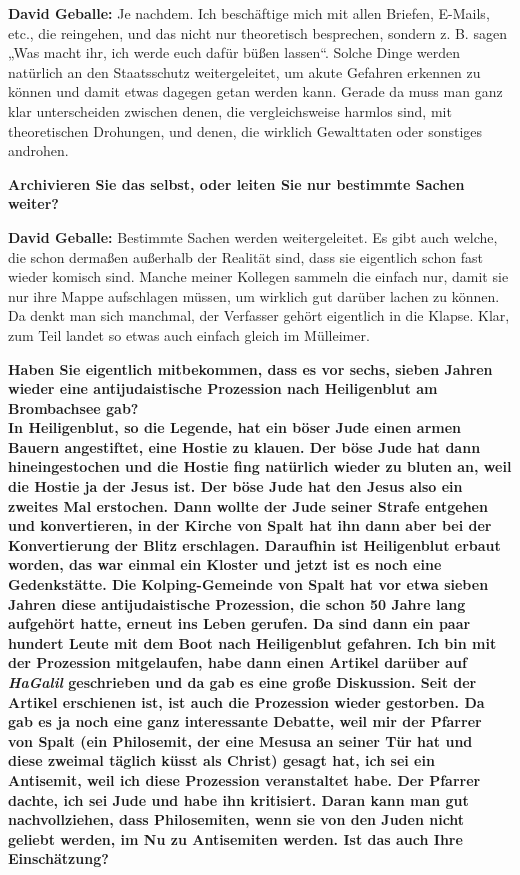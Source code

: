 \textbf{David Geballe:} Je nachdem. Ich beschäftige mich mit allen Briefen, E-Mails, etc., die reingehen, und das nicht nur theoretisch besprechen, sondern z. B. sagen „Was macht ihr, ich werde euch dafür büßen lassen“. Solche Dinge werden natürlich an den Staatsschutz weitergeleitet, um akute Gefahren erkennen zu können und damit etwas dagegen getan werden kann. Gerade da muss man ganz klar unterscheiden zwischen denen, die vergleichsweise harmlos sind, mit theoretischen Drohungen, und denen, die wirklich Gewalttaten oder sonstiges androhen. 

\textbf{Archivieren Sie das selbst, oder leiten Sie nur bestimmte Sachen weiter?} 

\textbf{David Geballe:} Bestimmte Sachen werden weitergeleitet. Es gibt auch welche, die schon dermaßen außerhalb der Realität sind, dass sie eigentlich schon fast wieder komisch sind. Manche meiner Kollegen sammeln die einfach nur, damit sie nur ihre Mappe aufschlagen müssen, um wirklich gut darüber lachen zu können. Da denkt man sich manchmal, der Verfasser gehört eigentlich in die Klapse. Klar, zum Teil landet so etwas auch einfach gleich im Mülleimer. 

\textbf{Haben Sie eigentlich mitbekommen, dass es vor sechs, sieben Jahren wieder eine antijudaistische Prozession nach Heiligenblut am Brombachsee gab? \\
In Heiligenblut, so die Legende, hat ein böser Jude einen armen Bauern angestiftet, eine Hostie zu klauen. Der böse Jude hat dann hineingestochen und die Hostie fing natürlich wieder zu bluten an, weil die Hostie ja der Jesus ist. Der böse Jude hat den Jesus also ein zweites Mal erstochen. Dann wollte der Jude seiner Strafe entgehen und konvertieren, in der Kirche von Spalt hat ihn dann aber bei der Konvertierung der Blitz erschlagen. Daraufhin ist Heiligenblut erbaut worden, das war einmal ein Kloster und jetzt ist es noch eine Gedenkstätte. Die Kolping-Gemeinde von Spalt hat vor etwa sieben Jahren diese antijudaistische Prozession, die schon 50 Jahre lang aufgehört hatte, erneut ins Leben gerufen. Da sind dann ein paar hundert Leute mit dem Boot nach Heiligenblut gefahren. Ich bin mit der Prozession mitgelaufen, habe dann einen Artikel darüber auf \textit{HaGalil} geschrieben und da gab es eine große Diskussion. Seit der Artikel erschienen ist, ist auch die Prozession wieder gestorben. Da gab es ja noch eine ganz interessante Debatte, weil mir der Pfarrer von Spalt (ein Philosemit, der eine Mesusa an seiner Tür hat und diese zweimal täglich küsst als Christ) gesagt hat, ich sei ein Antisemit, weil ich diese Prozession veranstaltet habe. Der Pfarrer dachte, ich sei Jude und habe ihn kritisiert. Daran kann man gut nachvollziehen, dass Philosemiten, wenn sie von den Juden nicht geliebt werden, im Nu zu Antisemiten werden. Ist das auch Ihre Einschätzung?}  

